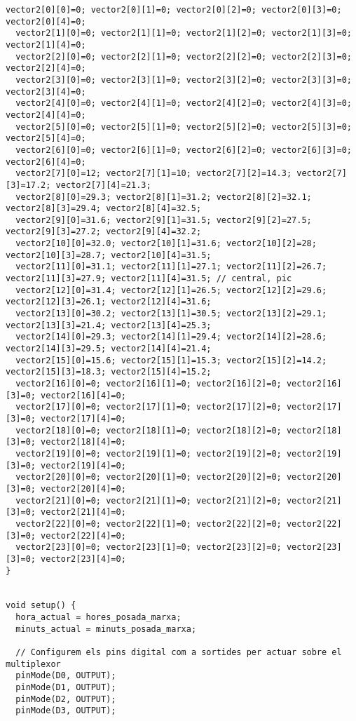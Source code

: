 \begin{lstlisting}[style=myArduino]
  vector2[0][0]=0; vector2[0][1]=0; vector2[0][2]=0; vector2[0][3]=0; vector2[0][4]=0;
  vector2[1][0]=0; vector2[1][1]=0; vector2[1][2]=0; vector2[1][3]=0; vector2[1][4]=0;
  vector2[2][0]=0; vector2[2][1]=0; vector2[2][2]=0; vector2[2][3]=0; vector2[2][4]=0;
  vector2[3][0]=0; vector2[3][1]=0; vector2[3][2]=0; vector2[3][3]=0; vector2[3][4]=0;
  vector2[4][0]=0; vector2[4][1]=0; vector2[4][2]=0; vector2[4][3]=0; vector2[4][4]=0;
  vector2[5][0]=0; vector2[5][1]=0; vector2[5][2]=0; vector2[5][3]=0; vector2[5][4]=0;
  vector2[6][0]=0; vector2[6][1]=0; vector2[6][2]=0; vector2[6][3]=0; vector2[6][4]=0;
  vector2[7][0]=12; vector2[7][1]=10; vector2[7][2]=14.3; vector2[7][3]=17.2; vector2[7][4]=21.3;
  vector2[8][0]=29.3; vector2[8][1]=31.2; vector2[8][2]=32.1; vector2[8][3]=29.4; vector2[8][4]=32.5;
  vector2[9][0]=31.6; vector2[9][1]=31.5; vector2[9][2]=27.5; vector2[9][3]=27.2; vector2[9][4]=32.2;
  vector2[10][0]=32.0; vector2[10][1]=31.6; vector2[10][2]=28; vector2[10][3]=28.7; vector2[10][4]=31.5;
  vector2[11][0]=31.1; vector2[11][1]=27.1; vector2[11][2]=26.7; vector2[11][3]=27.9; vector2[11][4]=31.5; // central, pic
  vector2[12][0]=31.4; vector2[12][1]=26.5; vector2[12][2]=29.6; vector2[12][3]=26.1; vector2[12][4]=31.6;
  vector2[13][0]=30.2; vector2[13][1]=30.5; vector2[13][2]=29.1; vector2[13][3]=21.4; vector2[13][4]=25.3;
  vector2[14][0]=29.3; vector2[14][1]=29.4; vector2[14][2]=28.6; vector2[14][3]=29.5; vector2[14][4]=21.4;
  vector2[15][0]=15.6; vector2[15][1]=15.3; vector2[15][2]=14.2; vector2[15][3]=18.3; vector2[15][4]=15.2;
  vector2[16][0]=0; vector2[16][1]=0; vector2[16][2]=0; vector2[16][3]=0; vector2[16][4]=0;
  vector2[17][0]=0; vector2[17][1]=0; vector2[17][2]=0; vector2[17][3]=0; vector2[17][4]=0;
  vector2[18][0]=0; vector2[18][1]=0; vector2[18][2]=0; vector2[18][3]=0; vector2[18][4]=0;
  vector2[19][0]=0; vector2[19][1]=0; vector2[19][2]=0; vector2[19][3]=0; vector2[19][4]=0;
  vector2[20][0]=0; vector2[20][1]=0; vector2[20][2]=0; vector2[20][3]=0; vector2[20][4]=0;
  vector2[21][0]=0; vector2[21][1]=0; vector2[21][2]=0; vector2[21][3]=0; vector2[21][4]=0;
  vector2[22][0]=0; vector2[22][1]=0; vector2[22][2]=0; vector2[22][3]=0; vector2[22][4]=0;
  vector2[23][0]=0; vector2[23][1]=0; vector2[23][2]=0; vector2[23][3]=0; vector2[23][4]=0;
}


void setup() {
  hora_actual = hores_posada_marxa;
  minuts_actual = minuts_posada_marxa;

  // Configurem els pins digital com a sortides per actuar sobre el multiplexor
  pinMode(D0, OUTPUT);
  pinMode(D1, OUTPUT);
  pinMode(D2, OUTPUT);
  pinMode(D3, OUTPUT);


\end{lstlisting}
